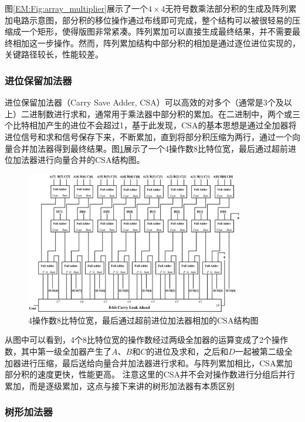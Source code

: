 图\ref{EM:Fig:array_multiplier}展示了一个$4\times4$无符号数乘法部分积的生成及阵列累加电路示意图，部分积的移位操作通过布线即可完成，整个结构可以被很轻易的压缩成一个矩形，使得版图非常紧凑。阵列累加可以直接生成最终结果，并不需要最终相加这一步操作。然而，阵列累加结构中部分积的相加是通过逐位进位实现的，关键路径较长，性能较差。

\subsubsection{进位保留加法器}

进位保留加法器（Carry Save Adder, CSA）可以高效的对多个（通常是3个及以上）二进制数进行求和，通常用于乘法器中部分积的累加。在二进制中，两个或三个比特相加产生的进位不会超过1，基于此发现，CSA的基本思想是通过全加器将进位信号和求和信号保存下来，不断累加，直到将部分积压缩为两行，通过一个向量合并加法器得到最终结果。图\ref{EM:Fig:CSA}展示了一个4操作数8比特位宽，最后通过超前进位加法器进行向量合并的CSA结构图。
\begin{figure}[!htb]
    \centering
    \includegraphics[width=0.85\textwidth]{figs/EM-CSA.png}
    \caption{4操作数8比特位宽，最后通过超前进位加法器相加的CSA结构图}
    \label{EM:Fig:CSA}
\end{figure}
从图中可以看到，4个8比特位宽的操作数经过两级全加器的运算变成了2个操作数，其中第一级全加器产生了$A$、$B$和$C$的进位及求和，之后和$D$一起被第二级全加器进行压缩，最后送给向量合并加法器进行求和。与阵列累加相比，CSA累加部分积的速度更快，性能更高。
注意这里的CSA并不会对操作数进行分组后并行累加，而是逐级累加\cite{数字集成电路_第十一章_设计运算功能块}，这点与接下来讲的树形加法器有本质区别%

\subsubsection{树形加法器}

